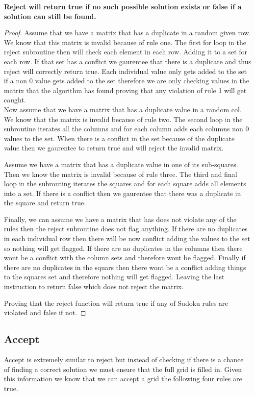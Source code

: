 \documentclass{sig-alternate}
\begin{document}
\textbf{Reject will return true if no such possible solution exists or false if a solution can still be found. }
\begin{proof}

Assume that we have a matrix that has a duplicate in a random given row. We know that this matrix is invalid because of rule one. The first for loop in the reject subroutine then will check each element in each row. Adding it to a set for each row. If that set has a conflict we gaurentee that there is a duplicate and thus reject will correctly return true. Each individual value only gets added to the set if a non 0 value gets added to the set therefore we are only checking values in the matrix that the algorithm has found proving that any violation of rule 1 will get caught. \\

Now assume that we have a matrix that has a duplicate value in a random col.
We know that the matrix is invalid because of rule two. The second loop in the subroutine iterates all the columns and for each column adds each columns non 0 values to the set. When there is a conflict in the set because of the duplicate value then we gaurentee to return true and will reject the invalid matrix. 

Assume we have a matrix that has a duplicate value in one of its sub-squares. Then we know the matrix is invalid because of rule three. The third and final loop in the subrouting iterates the squares and for each square adds all elements into a set. If there is a conflict then we gaurentee that there was a duplicate in the square and return true. 

Finally, we can assume we have a matrix that has does not violate any of the rules then the reject subroutine does not flag anything. If there are no duplicates in each individual row then there will be now conflict adding the values to the set so nothing will get flagged. If there are no duplicates in the columns then there wont be a conflict with the column sets and therefore wont be flagged. Finally if there are no duplicates in the squars then there wont be a conflict adding things to the squares set and therefore nothing will get flagged. Leaving the last instruction to return false which does not reject the matrix. 

Proving that the reject function will return true if any of Sudoku rules are violated and false if not. 
\end{proof}

\subsection{Accept}
Accept is extremely similar to reject but instead of checking if there is a chance of finding a correct solution we must ensure that the full grid is filled in. Given this information we know that we can accept a grid the following four rules are true. 
\end{document}
